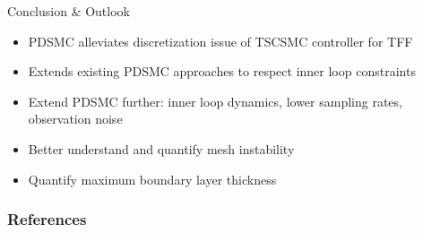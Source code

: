 \documentclass[]{beamer}
\begin{document}
\begin{frame}{Conclusion \& Outlook}

\begin{tcolorbox}[width=.99\textwidth,
colback={blue!10!},
standard jigsaw,
opacityback=1,  %
]  
\begin{itemize}
\item PDSMC alleviates discretization issue of TSCSMC controller for TFF
\item Extends existing PDSMC approaches to respect inner loop constraints 
\end{itemize}
\end{tcolorbox}

\begin{tcolorbox}[width=.99\textwidth,
colback={red!10!},
standard jigsaw,
opacityback=1,  %
]  
\begin{itemize}
\item Extend PDSMC further: inner loop dynamics, lower sampling rates, observation noise
\item Better understand and quantify mesh instability
\item Quantify maximum boundary layer thickness
\end{itemize}
\end{tcolorbox}

\end{frame}


\begin{frame}
\end{frame}

\usebackgroundtemplate{}

\frametitle{References}
\footnotesize
\vspace{2em}

        
%  
\end{document}
